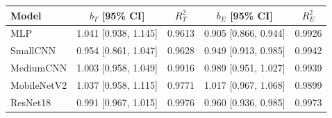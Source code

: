 \begin{tabular}{lcccc}
\toprule
Model & $b_T$ [95\% CI] & $R^2_T$ & $b_E$ [95\% CI] & $R^2_E$ \\
\midrule
MLP & 1.041 [0.938, 1.145] & 0.9613 & 0.905 [0.866, 0.944] & 0.9926 \\
SmallCNN & 0.954 [0.861, 1.047] & 0.9628 & 0.949 [0.913, 0.985] & 0.9942 \\
MediumCNN & 1.003 [0.958, 1.049] & 0.9916 & 0.989 [0.951, 1.027] & 0.9939 \\
MobileNetV2 & 1.037 [0.958, 1.115] & 0.9771 & 1.017 [0.967, 1.068] & 0.9899 \\
ResNet18 & 0.991 [0.967, 1.015] & 0.9976 & 0.960 [0.936, 0.985] & 0.9973 \\
\bottomrule
\end{tabular}